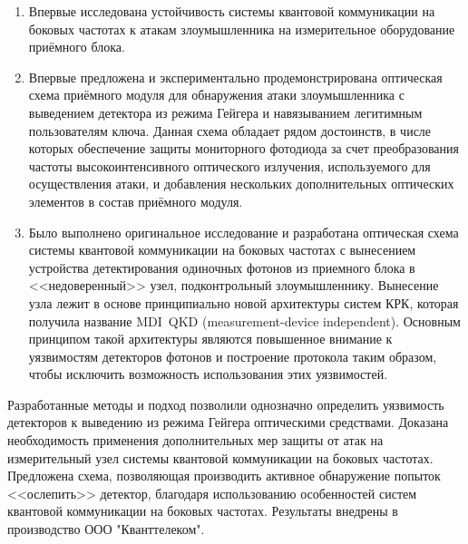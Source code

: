 {\novelty}
\begin{enumerate}
  \item Впервые исследована устойчивость системы квантовой коммуникации на боковых частотах к атакам злоумышленника на измерительное оборудование приёмного блока. 
  \item Впервые предложена и экспериментально продемонстрирована оптическая схема приёмного модуля для обнаружения атаки злоумышленника с выведением детектора из режима Гейгера и навязыванием легитимным пользователям ключа. Данная схема обладает рядом достоинств, в числе которых обеспечение защиты мониторного фотодиода за счет преобразования частоты высокоинтенсивного оптического излучения, используемого для осуществления атаки, и добавления нескольких дополнительных оптических элементов в состав приёмного модуля.
  \item Было выполнено оригинальное исследование и разработана оптическая схема системы квантовой коммуникации на боковых частотах с вынесением устройства детектирования одиночных фотонов из приемного блока в <<недоверенный>> узел, подконтрольный злоумышленнику. Вынесение узла лежит в основе принципиально новой архитектуры систем КРК, которая получила название MDI~QKD (measurement-device independent). Основным принципом такой архитектуры являются повышенное внимание к уязвимостям детекторов фотонов и построение протокола таким образом, чтобы исключить возможность использования этих уязвимостей.
\end{enumerate}

{\influence} 

Разработанные методы и подход позволили однозначно определить уязвимость детекторов к выведению из режима Гейгера оптическими средствами. Доказана необходимость применения дополнительных мер защиты от атак на измерительный узел системы квантовой коммуникации на боковых частотах. Предложена схема, позволяющая производить активное обнаружение попыток <<ослепить>> детектор, благодаря использованию особенностей систем квантовой коммуникации на боковых частотах. Результаты внедрены в производство ООО "Кванттелеком". 


